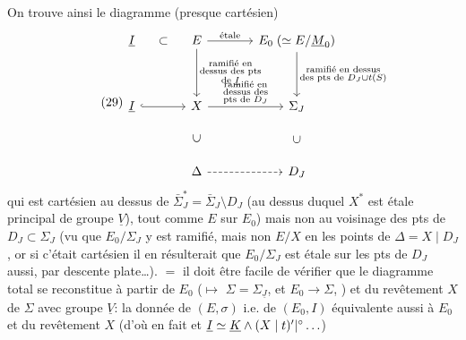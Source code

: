 On trouve ainsi le diagramme (presque cartésien)
\[
\tag{29}
\diagram{\begin{tikzcd}[ampersand replacement=\&,column sep=large,row sep=huge]
\underline I\arrow[r,phantom,"\subset"]\&E\arrow[r,"\text{étale}"]\arrow[d,"\substack{\text{ramifié en}\\\text{\unsure{dessus} des pts}\\\text{de }\underline I}"]\&E_0\;(\simeq E/\underline M_0)\arrow[d,"\substack{\text{ramifié en dessus}\\\text{des pts de }D_J\cup t(S)}"]\\
\underline I\arrow[r,hook]\&X\arrow[r,"\substack{\text{ramifié en}\\\text{dessus des}\\\text{pts de }D_J}"]\&\Sigma_J\\
\&\Delta\arrow[u,phantom,"\rotatebox{90}{$\subset$}"]\arrow[r,dashed]\&D_J\arrow[u,phantom,"\rotatebox{90}{$\subset$}"]
\end{tikzcd}}
\]
qui est cartésien au dessus de $\bar\Sigma_J^*=\bar\Sigma_J\setminus D_J$
(au dessus duquel $X^*$ est étale  principal de groupe $\underline V$), tout comme $E$ sur $E_0$) mais non au voisinage des pts de $D_J\subset\Sigma_J$ (vu que $E_0/\Sigma_J$ y est ramifié, mais non $E/X$ en les points de $\Delta=X\mid D_J$, or si c'était cartésien il en résulterait que $E_0/\Sigma_J$ est étale sur les pts de $D_J$ aussi, par descente plate\ldots).  $=$ il doit être facile de vérifier que le diagramme total se reconstitue à partir de $E_0$ ($\mapsto$  $\Sigma=\Sigma_{\underline J}$, et $E_0\longrightarrow\Sigma$, ) et du revêtement  $X$ de $\Sigma$ avec groupe  $\underline V$: la donnée de $(E,\sigma)$ i.e. de $(E_0,I)$   équivalente aussi à $E_0$ et du revêtement $X$ (d'où en fait  et $\underline I\simeq\underline K\wedge(X\mid t)'|^{\circ}\ldots$)

